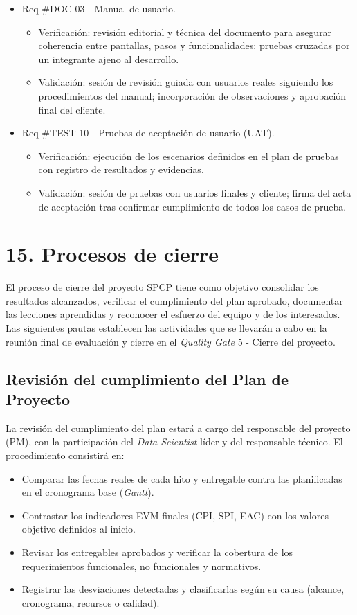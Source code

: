 \documentclass[12pt]
{charter}
\begin{document}
\begin{itemize}
\item Req \#DOC-03 - Manual de usuario.
  \begin{itemize}
    \item Verificación: revisión editorial y técnica del documento para asegurar coherencia entre pantallas, pasos y funcionalidades; pruebas cruzadas por un integrante ajeno al desarrollo.
    \item Validación: sesión de revisión guiada con usuarios reales siguiendo los procedimientos del manual; incorporación de observaciones y aprobación final del cliente.
  \end{itemize}

\item Req \#TEST-10 - Pruebas de aceptación de usuario (UAT).
  \begin{itemize}
    \item Verificación: ejecución de los escenarios definidos en el plan de pruebas con registro de resultados y evidencias.
    \item Validación: sesión de pruebas con usuarios finales y cliente; firma del acta de aceptación tras confirmar cumplimiento de todos los casos de prueba.
  \end{itemize}

\end{itemize}


\section{15. Procesos de cierre}    
\label{sec:cierre}

El proceso de cierre del proyecto SPCP tiene como objetivo consolidar los resultados alcanzados, verificar el cumplimiento del plan aprobado, documentar las lecciones aprendidas y reconocer el esfuerzo del equipo y de los interesados.  
Las siguientes pautas establecen las actividades que se llevarán a cabo en la reunión final de evaluación y cierre en el \textit{Quality Gate} 5 - Cierre del proyecto.

\subsection{Revisión del cumplimiento del Plan de Proyecto}
La revisión del cumplimiento del plan estará a cargo del responsable del proyecto (PM), con la participación del \textit{Data Scientist} líder y del responsable técnico.  
El procedimiento consistirá en:
\begin{itemize}
  \item Comparar las fechas reales de cada hito y entregable contra las planificadas en el cronograma base (\textit{Gantt}).
  \item Contrastar los indicadores EVM finales (CPI, SPI, EAC) con los valores objetivo definidos al inicio.
  \item Revisar los entregables aprobados y verificar la cobertura de los requerimientos funcionales, no funcionales y normativos.
  \item Registrar las desviaciones detectadas y clasificarlas según su causa (alcance, cronograma, recursos o calidad).
\end{itemize}
\end{document}
